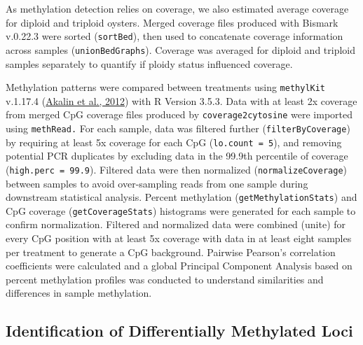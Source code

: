\documentclass [11pt, proquest] {uwthesis}[2015/03/03]
\begin{document}
As methylation detection relies on coverage, we also estimated average coverage for diploid and triploid oysters. Merged coverage files produced with Bismark v.0.22.3 were sorted (\texttt{sortBed}), then used to concatenate coverage information across samples (\texttt{unionBedGraphs}). Coverage was averaged for diploid and triploid samples separately to quantify if ploidy status influenced coverage.

Methylation patterns were compared between treatments using \texttt{methylKit} v.1.17.4 (\protect\hyperlink{ref-Akalin2012}{Akalin et al., 2012}) with R Version 3.5.3. Data with at least 2x coverage from merged CpG coverage files produced by \texttt{coverage2cytosine} were imported using \texttt{methRead.} For each sample, data was filtered further (\texttt{filterByCoverage}) by requiring at least 5x coverage for each CpG (\texttt{lo.count\ =\ 5}), and removing potential PCR duplicates by excluding data in the 99.9th percentile of coverage (\texttt{high.perc\ =\ 99.9}). Filtered data were then normalized (\texttt{normalizeCoverage}) between samples to avoid over-sampling reads from one sample during downstream statistical analysis. Percent methylation (\texttt{getMethylationStats}) and CpG coverage (\texttt{getCoverageStats}) histograms were generated for each sample to confirm normalization. Filtered and normalized data were combined (unite) for every CpG position with at least 5x coverage with data in at least eight samples per treatment to generate a CpG background. Pairwise Pearson's correlation coefficients were calculated and a global Principal Component Analysis based on percent methylation profiles was conducted to understand similarities and differences in sample methylation.

\hypertarget{identification-of-differentially-methylated-loci-1}{%
\subsection{Identification of Differentially Methylated Loci}\label{identification-of-differentially-methylated-loci-1}}
\end{document}
